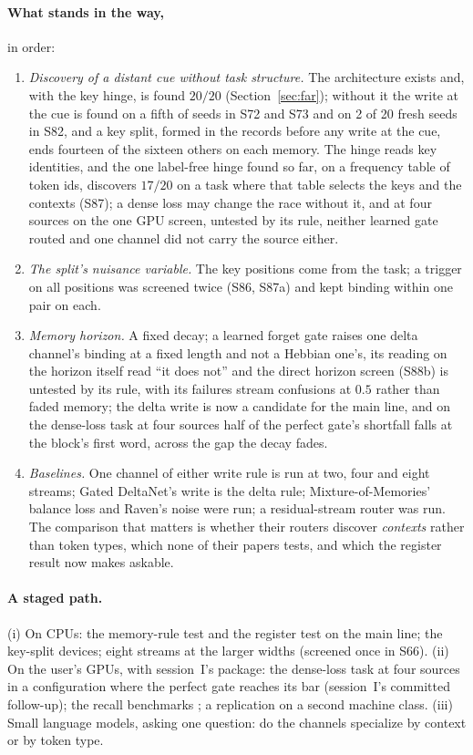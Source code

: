 \documentclass[11pt]{article}
\begin{document}
\paragraph{What stands in the way,} in order:
\begin{enumerate}
\item \emph{Discovery of a distant cue without task structure.} The architecture exists and, with the key hinge, is found $20/20$ (Section~\ref{sec:far}); without it the write at the cue is found on a fifth of seeds in S72 and S73 and on 2 of 20 fresh seeds in S82, and a key split, formed in the records before any write at the cue, ends fourteen of the sixteen others on each memory. The hinge reads key identities, and the one label-free hinge found so far, on a frequency table of token ids, discovers $17/20$ on a task where that table selects the keys and the contexts (S87); a dense loss may change the race without it, and at four sources on the one GPU screen, untested by its rule, neither learned gate routed and one channel did not carry the source either.
\item \emph{The split's nuisance variable.} The key positions come from the task; a trigger on all positions was screened twice (S86, S87a) and kept binding within one pair on each.
\item \emph{Memory horizon.} A fixed decay; a learned forget gate raises one delta channel's binding at a fixed length and not a Hebbian one's, its reading on the horizon itself read ``it does not'' and the direct horizon screen (S88b) is untested by its rule, with its failures stream confusions at $0.5$ rather than faded memory; the delta write is now a candidate for the main line, and on the dense-loss task at four sources half of the perfect gate's shortfall falls at the block's first word, across the gap the decay fades.
\item \emph{Baselines.} One channel of either write rule is run at two, four and eight streams; Gated DeltaNet's write is the delta rule; Mixture-of-Memories' balance loss and Raven's noise were run; a residual-stream router was run. The comparison that matters is whether their routers discover \emph{contexts} rather than token types, which none of their papers tests, and which the register result now makes askable.
\end{enumerate}

\paragraph{A staged path.} (i) On CPUs: the memory-rule test and the register test on the main line; the key-split devices; eight streams at the larger widths (screened once in S66). (ii) On the user's GPUs, with session~I's package: the dense-loss task at four sources in a configuration where the perfect gate reaches its bar (session~I's committed follow-up); the recall benchmarks \cite{zoology}; a replication on a second machine class. (iii) Small language models, asking one question: do the channels specialize by context or by token type.
\end{document}
